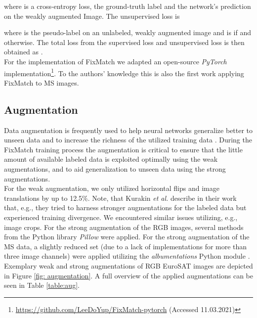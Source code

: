 \documentclass[journal]{IEEEtran}
\newcommand{\etal}{\textit{et al.}}
\begin{document}
where  is a cross-entropy loss,  the ground-truth label and  the network's prediction on the weakly augmented Image. The unsupervised loss is

where  is the pseudo-label on an unlabeled, weakly augmented image and  is  if  and  otherwise.
The total loss from the supervised loss  and unsupervised loss  is then obtained as . \\
For the implementation of FixMatch we adapted an open-source \textit{PyTorch} implementation\footnote{\url{https://github.com/LeeDoYup/FixMatch-pytorch} (Accessed 11.03.2021)}. To the authors' knowledge this is also the first work applying FixMatch to MS images.

\subsection{Augmentation}
Data augmentation is frequently used to help neural networks generalize better to unseen data and to increase the richness of the utilized training data \cite{cubuk2018,cubuk2020}. During the FixMatch training process the augmentation is critical to ensure that the little amount of available labeled data is exploited optimally using the weak augmentations, and to aid generalization to unseen data using the strong augmentations. \\
For the weak augmentation, we only utilized horizontal flips and image translations by up to 12.5\%.
Note, that Kurakin \etal{} \cite{kurakin2020} describe in their work that, e.g., they tried to harness stronger augmentations for the labeled data but experienced training divergence. We encountered similar issues utilizing, e.g., image crops. For the strong augmentation of the RGB images, several methods from the Python library \textit{Pillow} were applied. For the strong augmentation of the MS data, a slightly reduced set (due to a lack of implementations for more than three image channels) were applied utilizing the \textit{albumentations} Python module \cite{buslaev2020}. 
Exemplary weak and strong augmentations of RGB EuroSAT images are depicted in Figure \ref{fig: augmentation}. A full overview of the applied augmentations can be seen in Table \ref{table:aug}.
\end{document}
